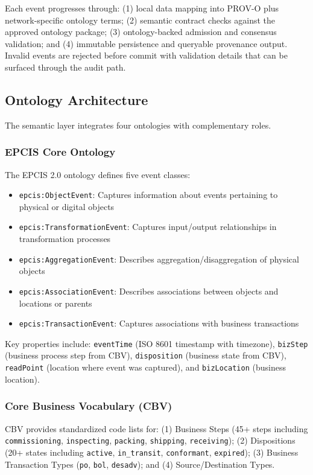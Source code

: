 \documentclass[preprint,review,12pt,authoryear]{elsarticle}
\begin{document}
Each event progresses through: (1) local data mapping into PROV-O plus network-specific ontology terms; (2) semantic contract checks against the approved ontology package; (3) ontology-backed admission and consensus validation; and (4) immutable persistence and queryable provenance output. Invalid events are rejected before commit with validation details that can be surfaced through the audit path.

\subsection{Ontology Architecture}

The semantic layer integrates four ontologies with complementary roles.

\subsubsection{EPCIS Core Ontology}

The EPCIS 2.0 ontology defines five event classes:

\begin{itemize}
    \item \texttt{epcis:ObjectEvent}: Captures information about events pertaining to physical or digital objects
    \item \texttt{epcis:TransformationEvent}: Captures input/output relationships in transformation processes
    \item \texttt{epcis:AggregationEvent}: Describes aggregation/disaggregation of physical objects
    \item \texttt{epcis:AssociationEvent}: Describes associations between objects and locations or parents
    \item \texttt{epcis:TransactionEvent}: Captures associations with business transactions
\end{itemize}

Key properties include: \texttt{eventTime} (ISO 8601 timestamp with timezone), \texttt{bizStep} (business process step from CBV), \texttt{disposition} (business state from CBV), \texttt{readPoint} (location where event was captured), and \texttt{bizLocation} (business location).

\subsubsection{Core Business Vocabulary (CBV)}

CBV provides standardized code lists for: (1) Business Steps (45+ steps including \texttt{commissioning}, \texttt{inspecting}, \texttt{packing}, \texttt{shipping}, \texttt{receiving}); (2) Dispositions (20+ states including \texttt{active}, \texttt{in\_transit}, \texttt{conformant}, \texttt{expired}); (3) Business Transaction Types (\texttt{po}, \texttt{bol}, \texttt{desadv}); and (4) Source/Destination Types.
\end{document}
